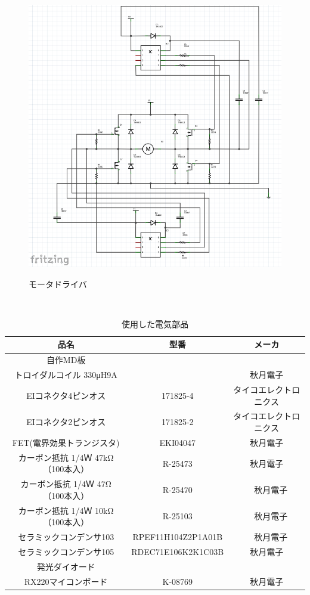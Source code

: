 \documentclass[12pt,oneside]{sotsuken_paper}
\begin{document}
\begin{figure}[htp] 
 \begin{center} 
  \includegraphics[width=140mm]{img/hard/kairozu.png} 
 　\caption{モータドライバ} 
  \label{fig:denkikairo}%
 \end{center} 
\end{figure} 


\begin{table}[htp] 
 　\begin{center} 
    \caption{使用した電気部品} 
  \begin{tabular}{|c|c|c|} \hline 
品名 & 型番 & メーカ   \\  \hline 
自作MD板  & 　&\\ \hline 
トロイダルコイル 330μH9A  &  &秋月電子\\ \hline 
EIコネクタ4ピンオス  & 171825-4　& タイコエレクトロニクス\\ \hline 
EIコネクタ2ピンオス  & 171825-2 & タイコエレクトロニクス \\ \hline 
FET(電界効果トランジスタ) & EKI04047 & 秋月電子\\ \hline 
カーボン抵抗 1/4Ｗ 47kΩ （100本入） & R-25473 & 秋月電子\\ \hline 
カーボン抵抗 1/4Ｗ 47Ω （100本入） &  R-25470 &　秋月電子\\ \hline 
カーボン抵抗 1/4Ｗ 10kΩ （100本入） & R-25103 &　秋月電子\\ \hline 
セラミックコンデンサ103 & RPEF11H104Z2P1A01B &　秋月電子 \\ \hline 
セラミックコンデンサ105 & RDEC71E106K2K1C03B & 秋月電子 \\ \hline 
発光ダイオード &  &\\ \hline 
RX220マイコンボード & K-08769 & 秋月電子\\ \hline 
  \end{tabular} 
　   \label{tab:denkibuhin} 
  \end{center} 
\end{table} 
\end{document}
